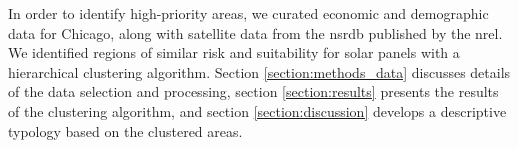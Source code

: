 In order to identify high-priority areas, we curated economic and demographic
data for Chicago, along with satellite data from the \ac{nsrdb} published by the
\ac{nrel}. We identified regions of similar risk and suitability for solar panels
with a hierarchical clustering algorithm. Section \ref{section:methods_data}
discusses details of the data selection and processing, section \ref{section:results}
presents the results of the clustering algorithm, and section \ref{section:discussion}
develops a descriptive typology based on the clustered areas.
